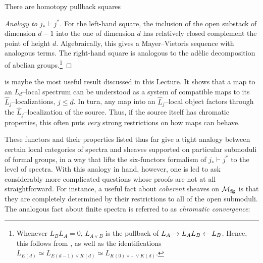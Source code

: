 \begin{corollary}\label{ChromaticFractureSquares}
There are homotopy pullback squares
\begin{center}
\end{center}
\end{corollary}
\begin{proof}[Analogy to \(j_* \vdash j^*\)]
For the left-hand square, the inclusion of the open substack of dimension \(d-1\) into the one of dimension \(d\) has relatively closed complement the point of height \(d\).  Algebraically, this gives a Mayer--Vietoris sequence with analogous terms.  The right-hand square is analogous to the ad\`elic decomposition of abelian groups.\footnote{Whenever \(L_B L_A = 0\), \(L_{A \vee B}\) is the pullback of \(L_A \to L_A L_B \leftarrow L_B\).  Hence, this follows from , as well as the identifications \(L_{E(d)} \simeq L_{E(d-1) \vee K(d)} \simeq L_{K(0) \vee \cdots \vee K(d)}\).}
\end{proof}

\begin{remark}
 is maybe the most useful result discussed in this Lecture.  It shows that a map to an \(L_d\)--local spectrum can be understood as a system of compatible maps to its \(\widehat L_j\)--localizations, \(j \le d\).  In turn, any map into an \(\widehat L_j\)--local object factors through the \(\widehat L_j\)--localization of the source.  Thus, if the source itself has chromatic properties, this often puts \emph{very} strong restrictions on how maps can behave.
\end{remark}

These functors and their properties listed thus far give a tight analogy between certain local categories of spectra and sheaves supported on particular submoduli of formal groups, in a way that lifts the six-functors formalism of \(j_* \vdash j^*\) to the level of spectra.  With this analogy in hand, however, one is led to ask considerably more complicated questions whose proofs are not at all straightforward.  For instance, a useful fact about \emph{coherent} sheaves on \(\mathcal{M}_{\mathbf{fg}}\) is that they are completely determined by their restrictions to all of the open submoduli.  The analogous fact about finite spectra is referred to as \textit{chromatic convergence}:

